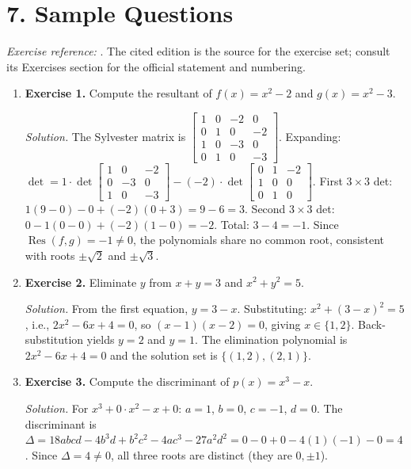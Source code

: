 \section*{7. Sample Questions}
\emph{Exercise reference:} \cite{elimination_theory_ref1}. The cited edition is the source for the exercise set; consult its Exercises section for the official statement and numbering.
\begin{enumerate}[leftmargin=*,itemsep=0.9em]

\item \textbf{Exercise 1.} Compute the resultant of $f(x)=x^2-2$ and $g(x)=x^2-3$.

\emph{Solution.} The Sylvester matrix is $\begin{bmatrix}1&0&-2&0\\0&1&0&-2\\1&0&-3&0\\0&1&0&-3\end{bmatrix}$. Expanding: $\det=1\cdot\det\begin{bmatrix}1&0&-2\\0&-3&0\\1&0&-3\end{bmatrix}-(-2)\cdot\det\begin{bmatrix}0&1&-2\\1&0&0\\0&1&0\end{bmatrix}$. First $3\times3$ det: $1(9-0)-0+(-2)(0+3)=9-6=3$. Second $3\times3$ det: $0-1(0-0)+(-2)(1-0)=-2$. Total: $3-4=-1$. Since $\operatorname{Res}(f,g)=-1\neq0$, the polynomials share no common root, consistent with roots $\pm\sqrt{2}$ and $\pm\sqrt{3}$.

\item \textbf{Exercise 2.} Eliminate $y$ from $x+y=3$ and $x^2+y^2=5$.

\emph{Solution.} From the first equation, $y=3-x$. Substituting: $x^2+(3-x)^2=5$, i.e., $2x^2-6x+4=0$, so $(x-1)(x-2)=0$, giving $x\in\{1,2\}$. Back-substitution yields $y=2$ and $y=1$. The elimination polynomial is $2x^2-6x+4=0$ and the solution set is $\{(1,2),(2,1)\}$.

\item \textbf{Exercise 3.} Compute the discriminant of $p(x)=x^3-x$.

\emph{Solution.} For $x^3+0\cdot x^2-x+0$: $a=1$, $b=0$, $c=-1$, $d=0$. The discriminant is $\Delta=18abcd-4b^3d+b^2c^2-4ac^3-27a^2d^2=0-0+0-4(1)(-1)-0=4$. Since $\Delta=4\neq0$, all three roots are distinct (they are $0,\pm1$).


\end{enumerate}
